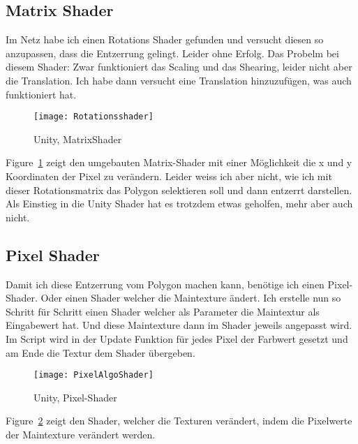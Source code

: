 \subsection{Matrix Shader}
Im Netz habe ich einen Rotations Shader gefunden und versucht diesen so anzupassen, dass die Entzerrung gelingt. Leider ohne Erfolg. Das Probelm bei diesem Shader: Zwar funktioniert das Scaling und das Shearing, leider nicht aber die Translation.
Ich habe dann versucht eine Translation hinzuzufügen, was auch funktioniert hat.  

\begin{figure}[H]
	\texttt{[image: Rotationsshader]}
	\caption{Unity, MatrixShader}
	\label{fig:MatrixShader}
\end{figure}


Figure~\ref{fig:MatrixShader} zeigt den umgebauten Matrix-Shader mit einer Möglichkeit die x und y Koordinaten der Pixel zu verändern.
Leider weiss ich aber nicht, wie ich mit dieser Rotationsmatrix das Polygon selektieren soll und dann entzerrt darstellen.
Als Einstieg in die Unity Shader hat es trotzdem etwas geholfen, mehr aber auch nicht.

\subsection{Pixel Shader}
Damit ich diese Entzerrung vom Polygon machen kann, benötige ich einen Pixel-Shader. Oder einen Shader welcher die Maintexture ändert.
Ich erstelle nun so Schritt für Schritt einen Shader welcher als Parameter die Maintextur als Eingabewert hat. Und diese Maintexture dann im Shader jeweils angepasst wird. \\  Im Script wird in der Update Funktion für jedes Pixel der Farbwert gesetzt und am Ende die Textur dem Shader übergeben.


\begin{figure}[H]
	\texttt{[image: PixelAlgoShader]}
	\caption{Unity, Pixel-Shader}
	\label{fig:PixelShader}
\end{figure}

Figure~\ref{fig:PixelShader} zeigt den Shader, welcher die Texturen verändert, indem die Pixelwerte der Maintexture verändert werden.

